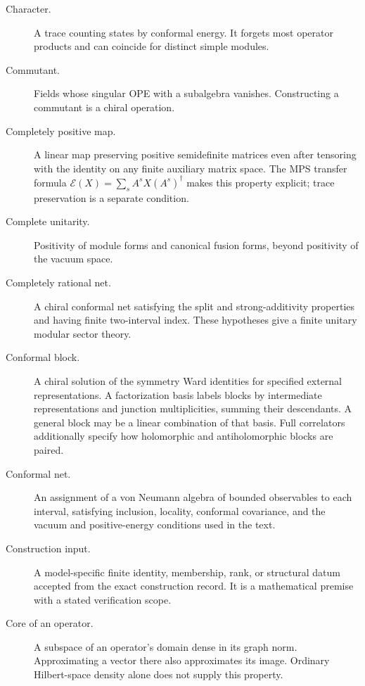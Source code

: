 \begin{description}
\item[Character.]A trace counting states by conformal energy.
It forgets most operator products and can coincide for distinct
simple modules.

\item[Commutant.]Fields whose singular OPE with a subalgebra
vanishes. Constructing a commutant is a chiral operation.

\item[Completely positive map.]A linear map preserving positive
semidefinite matrices even after tensoring with the identity on
any finite auxiliary matrix space. The MPS transfer formula
$\mathcal E(X)=\sum_sA^sX(A^s)^\dagger$ makes this property
explicit; trace preservation is a separate condition.

\item[Complete unitarity.]Positivity of module forms and canonical
fusion forms, beyond positivity of the vacuum space.

\item[Completely rational net.]A chiral conformal net satisfying
the split and strong-additivity properties and having finite
two-interval index. These hypotheses give a finite unitary
modular sector theory.

\item[Conformal block.]A chiral solution of the symmetry Ward
identities for specified external representations. A factorization
basis labels blocks by intermediate representations and junction
multiplicities, summing their descendants. A general block may be
a linear combination of that basis. Full correlators additionally
specify how holomorphic and antiholomorphic blocks are paired.

\item[Conformal net.]An assignment of a von Neumann algebra of
bounded observables to each interval, satisfying inclusion,
locality, conformal covariance, and the vacuum and positive-energy
conditions used in the text.

\item[Construction input.]A model-specific finite identity,
membership, rank, or structural datum accepted from the exact
construction record. It is a mathematical premise with a stated
verification scope.

\item[Core of an operator.]A subspace of an operator's domain
dense in its graph norm. Approximating a vector there also
approximates its image. Ordinary Hilbert-space density alone
does not supply this property.


\end{description}
